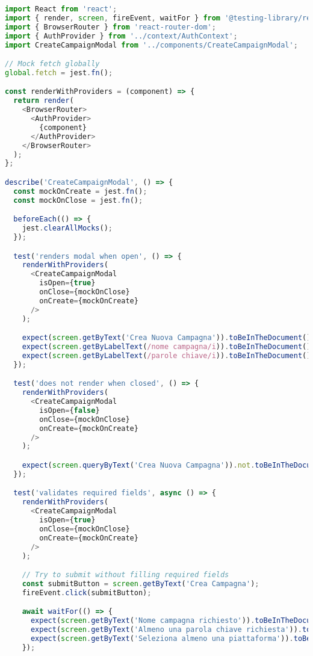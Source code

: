 \documentclass[12pt,a4paper]{report}
\begin{document}
\begin{lstlisting}[language=javascript, caption=Example React Component Tests]
import React from 'react';
import { render, screen, fireEvent, waitFor } from '@testing-library/react';
import { BrowserRouter } from 'react-router-dom';
import { AuthProvider } from '../context/AuthContext';
import CreateCampaignModal from '../components/CreateCampaignModal';

// Mock fetch globally
global.fetch = jest.fn();

const renderWithProviders = (component) => {
  return render(
    <BrowserRouter>
      <AuthProvider>
        {component}
      </AuthProvider>
    </BrowserRouter>
  );
};

describe('CreateCampaignModal', () => {
  const mockOnCreate = jest.fn();
  const mockOnClose = jest.fn();

  beforeEach(() => {
    jest.clearAllMocks();
  });

  test('renders modal when open', () => {
    renderWithProviders(
      <CreateCampaignModal 
        isOpen={true} 
        onClose={mockOnClose} 
        onCreate={mockOnCreate} 
      />
    );

    expect(screen.getByText('Crea Nuova Campagna')).toBeInTheDocument();
    expect(screen.getByLabelText(/nome campagna/i)).toBeInTheDocument();
    expect(screen.getByLabelText(/parole chiave/i)).toBeInTheDocument();
  });

  test('does not render when closed', () => {
    renderWithProviders(
      <CreateCampaignModal 
        isOpen={false} 
        onClose={mockOnClose} 
        onCreate={mockOnCreate} 
      />
    );

    expect(screen.queryByText('Crea Nuova Campagna')).not.toBeInTheDocument();
  });

  test('validates required fields', async () => {
    renderWithProviders(
      <CreateCampaignModal 
        isOpen={true} 
        onClose={mockOnClose} 
        onCreate={mockOnCreate} 
      />
    );

    // Try to submit without filling required fields
    const submitButton = screen.getByText('Crea Campagna');
    fireEvent.click(submitButton);

    await waitFor(() => {
      expect(screen.getByText('Nome campagna richiesto')).toBeInTheDocument();
      expect(screen.getByText('Almeno una parola chiave richiesta')).toBeInTheDocument();
      expect(screen.getByText('Seleziona almeno una piattaforma')).toBeInTheDocument();
    });


\end{lstlisting}
\end{document}
